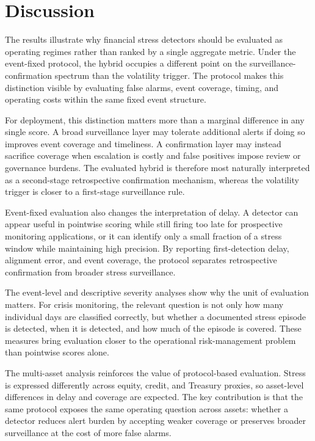\documentclass[pdflatex,sn-mathphys-num]{sn-jnl}
\begin{document}
\section{Discussion}
The results illustrate why financial stress detectors should be evaluated as operating regimes rather than ranked by a single aggregate metric. Under the event-fixed protocol, the hybrid occupies a different point on the surveillance-confirmation spectrum than the volatility trigger. The protocol makes this distinction visible by evaluating false alarms, event coverage, timing, and operating costs within the same fixed event structure.

For deployment, this distinction matters more than a marginal difference in any single score. A broad surveillance layer may tolerate additional alerts if doing so improves event coverage and timeliness. A confirmation layer may instead sacrifice coverage when escalation is costly and false positives impose review or governance burdens. The evaluated hybrid is therefore most naturally interpreted as a second-stage retrospective confirmation mechanism, whereas the volatility trigger is closer to a first-stage surveillance rule.

Event-fixed evaluation also changes the interpretation of delay. A detector can appear useful in pointwise scoring while still firing too late for prospective monitoring applications, or it can identify only a small fraction of a stress window while maintaining high precision. By reporting first-detection delay, alignment error, and event coverage, the protocol separates retrospective confirmation from broader stress surveillance.

The event-level and descriptive severity analyses show why the unit of evaluation matters. For crisis monitoring, the relevant question is not only how many individual days are classified correctly, but whether a documented stress episode is detected, when it is detected, and how much of the episode is covered. These measures bring evaluation closer to the operational risk-management problem than pointwise scores alone.

The multi-asset analysis reinforces the value of protocol-based evaluation. Stress is expressed differently across equity, credit, and Treasury proxies, so asset-level differences in delay and coverage are expected. The key contribution is that the same protocol exposes the same operating question across assets: whether a detector reduces alert burden by accepting weaker coverage or preserves broader surveillance at the cost of more false alarms.
\end{document}
